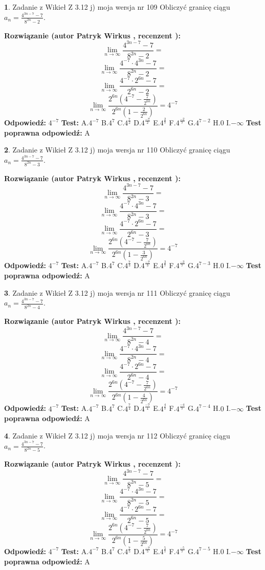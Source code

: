 \documentclass[12pt, a4paper]{article}
\theoremstyle{definition} %
\newtheorem{zad}{}
\newcommand{\zadStart}[1]{\begin{zad}#1\newline}
\newcommand{\zadStop}{\end{zad}}
\newcommand{\rozwStart}[2]{\noindent \textbf{Rozwiązanie (autor #1 , recenzent #2): }\newline}
\newcommand{\rozwStop}{\newline}
\newcommand{\odpStart}{\noindent \textbf{Odpowiedź:}\newline}
\newcommand{\odpStop}{\newline}
\newcommand{\testStart}{\noindent \textbf{Test:}\newline}
\newcommand{\testStop}{\newline}
\newcommand{\kluczStart}{\noindent \textbf{Test poprawna odpowiedź:}\newline}
\newcommand{\kluczStop}{\newline}
\begin{document}
\zadStart{Zadanie z Wikieł Z 3.12 j) moja wersja nr 109}
Obliczyć granicę ciągu $a_{n}=\frac{4^{3n-7}-7}{8^{2n}-2}$.
\zadStop
\rozwStart{Patryk Wirkus}{}
$$\lim\limits_{n\to\infty}\frac{4^{3n-7}-7}{8^{2n}-2}=$$
$$\lim\limits_{n\to\infty}\frac{4^{-7} \cdot 4^{3n}-7}{8^{2n}-2}=$$
$$\lim\limits_{n\to\infty}\frac{4^{-7} \cdot 2^{6n}-7}{2^{6n}-2}=$$
$$\lim\limits_{n\to\infty}\frac{2^{6n}(4^{-7} - \frac{7}{2^{6n}})}{2^{6n}(1-\frac{2}{2^{6n}})}= 4^{-7}$$
\rozwStop
\odpStart
$4^{-7}$
\odpStop
\testStart
A.$4^{-7}$
B.$4^{7}$
C.$4^{\frac{7}{2}}$
D.$4^{\frac{-7}{2}}$
E.$4^{\frac{2}{7}}$
F.$4^{\frac{-2}{7}}$
G.$4^{7-2}$
H.$0$
I.$-\infty$
\testStop
\kluczStart
A
\kluczStop



\zadStart{Zadanie z Wikieł Z 3.12 j) moja wersja nr 110}
Obliczyć granicę ciągu $a_{n}=\frac{4^{3n-7}-7}{8^{2n}-3}$.
\zadStop
\rozwStart{Patryk Wirkus}{}
$$\lim\limits_{n\to\infty}\frac{4^{3n-7}-7}{8^{2n}-3}=$$
$$\lim\limits_{n\to\infty}\frac{4^{-7} \cdot 4^{3n}-7}{8^{2n}-3}=$$
$$\lim\limits_{n\to\infty}\frac{4^{-7} \cdot 2^{6n}-7}{2^{6n}-3}=$$
$$\lim\limits_{n\to\infty}\frac{2^{6n}(4^{-7} - \frac{7}{2^{6n}})}{2^{6n}(1-\frac{3}{2^{6n}})}= 4^{-7}$$
\rozwStop
\odpStart
$4^{-7}$
\odpStop
\testStart
A.$4^{-7}$
B.$4^{7}$
C.$4^{\frac{7}{3}}$
D.$4^{\frac{-7}{3}}$
E.$4^{\frac{3}{7}}$
F.$4^{\frac{-3}{7}}$
G.$4^{7-3}$
H.$0$
I.$-\infty$
\testStop
\kluczStart
A
\kluczStop



\zadStart{Zadanie z Wikieł Z 3.12 j) moja wersja nr 111}
Obliczyć granicę ciągu $a_{n}=\frac{4^{3n-7}-7}{8^{2n}-4}$.
\zadStop
\rozwStart{Patryk Wirkus}{}
$$\lim\limits_{n\to\infty}\frac{4^{3n-7}-7}{8^{2n}-4}=$$
$$\lim\limits_{n\to\infty}\frac{4^{-7} \cdot 4^{3n}-7}{8^{2n}-4}=$$
$$\lim\limits_{n\to\infty}\frac{4^{-7} \cdot 2^{6n}-7}{2^{6n}-4}=$$
$$\lim\limits_{n\to\infty}\frac{2^{6n}(4^{-7} - \frac{7}{2^{6n}})}{2^{6n}(1-\frac{4}{2^{6n}})}= 4^{-7}$$
\rozwStop
\odpStart
$4^{-7}$
\odpStop
\testStart
A.$4^{-7}$
B.$4^{7}$
C.$4^{\frac{7}{4}}$
D.$4^{\frac{-7}{4}}$
E.$4^{\frac{4}{7}}$
F.$4^{\frac{-4}{7}}$
G.$4^{7-4}$
H.$0$
I.$-\infty$
\testStop
\kluczStart
A
\kluczStop



\zadStart{Zadanie z Wikieł Z 3.12 j) moja wersja nr 112}
Obliczyć granicę ciągu $a_{n}=\frac{4^{3n-7}-7}{8^{2n}-5}$.
\zadStop
\rozwStart{Patryk Wirkus}{}
$$\lim\limits_{n\to\infty}\frac{4^{3n-7}-7}{8^{2n}-5}=$$
$$\lim\limits_{n\to\infty}\frac{4^{-7} \cdot 4^{3n}-7}{8^{2n}-5}=$$
$$\lim\limits_{n\to\infty}\frac{4^{-7} \cdot 2^{6n}-7}{2^{6n}-5}=$$
$$\lim\limits_{n\to\infty}\frac{2^{6n}(4^{-7} - \frac{7}{2^{6n}})}{2^{6n}(1-\frac{5}{2^{6n}})}= 4^{-7}$$
\rozwStop
\odpStart
$4^{-7}$
\odpStop
\testStart
A.$4^{-7}$
B.$4^{7}$
C.$4^{\frac{7}{5}}$
D.$4^{\frac{-7}{5}}$
E.$4^{\frac{5}{7}}$
F.$4^{\frac{-5}{7}}$
G.$4^{7-5}$
H.$0$
I.$-\infty$
\testStop
\kluczStart
A
\kluczStop
\end{document}
